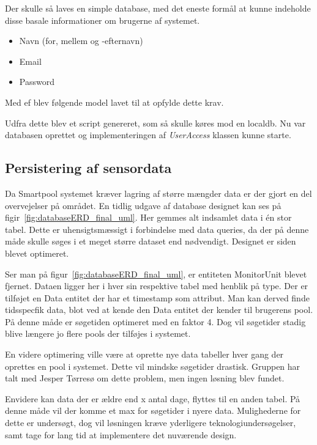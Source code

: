 Der skulle så laves en simple database, med det eneste formål at kunne indeholde disse basale informationer om brugerne af systemet.

\begin{itemize}
	\item Navn (for, mellem og -efternavn)
	\item Email
	\item Password
\end{itemize}

Med \gls{ef} blev følgende model lavet til at opfylde dette krav.

Udfra dette blev et script genereret, som så skulle køres mod en localdb. Nu var databasen oprettet og implementeringen af \textit{UserAccess} klassen kunne starte.

\subsection{Persistering af sensordata}
Da Smartpool systemet kræver lagring af større mængder data er der gjort en del overvejelser på området. 
En tidlig udgave af database designet kan ses på figir~\ref{fig:databaseERD_final_uml}. Her gemmes alt indsamlet data i én stor tabel. Dette er uhensigtsmæssigt i forbindelse med data queries, da der på denne måde skulle søges i et meget større dataset end nødvendigt. Designet er siden blevet optimeret. 

Ser man på figur~\ref{fig:databaseERD_final_uml}, er entiteten MonitorUnit blevet fjernet. Dataen ligger her i hver sin respektive tabel med henblik på type. Der er tilføjet en Data entitet der har et timestamp som attribut. Man kan derved finde tidsspecfik data, blot ved at kende den Data entitet der kender til brugerens pool. På denne måde er søgetiden optimeret med en faktor 4. Dog vil søgetider stadig blive længere jo flere pools der tilføjes i systemet.

En videre optimering ville være at oprette nye data tabeller hver gang der oprettes en pool i systemet. Dette vil mindske søgetider drastisk. Gruppen har talt med Jesper Tørresø om dette problem, men ingen løsning blev fundet.

Envidere kan data der er ældre end x antal dage, flyttes til en anden tabel. På denne måde vil der komme et max for søgetider i nyere data.
Mulighederne for dette er undersøgt, dog vil løsningen kræve yderligere teknologiundersøgelser, samt tage for lang tid at implementere det nuværende design.

